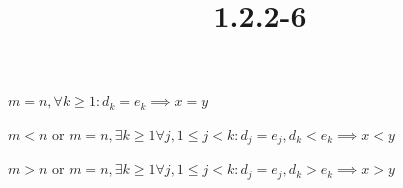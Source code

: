 \documentclass{article}
\title{1.2.2-6}
\begin{document}
\maketitle

$m = n, \forall k \geq 1: d_k = e_k \implies x = y$

$m < n$ or $m = n, \exists k \geq 1 \forall j, 1 \leq j < k: d_j = e_j, d_k < e_k \implies x < y$

$m > n$ or $m = n, \exists k \geq 1 \forall j, 1 \leq j < k: d_j = e_j, d_k > e_k \implies x > y$
\end{document}
